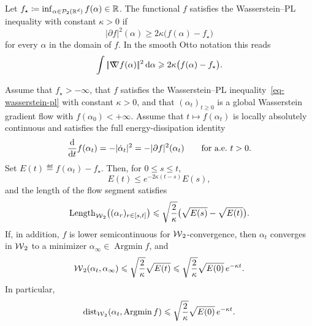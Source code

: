 \begin{defn}\label{def-wasserstein-pl}
	Let \(f_\star\coloneqq\inf_{\alpha\in\mathcal{P}_2(\mathbb{R}^d)} f(\alpha)\in\mathbb{R}\). The functional \(f\) satisfies the Wasserstein--PL inequality with constant \(\kappa>0\) if
	\begin{equation}\label{eq-wasserstein-pl}
		|\partial f|^2(\alpha)
		\geq
		2\kappa\bigl(f(\alpha)-f_\star\bigr)
	\end{equation}
	for every \(\alpha\) in the domain of \(f\). In the smooth Otto notation this reads
	\[
		\int|\!| \mathord{\nabla\mkern-9.3mu\nabla} f(\alpha) |\!|^2\,\mathrm{d}\alpha
		\geqslant
		2\kappa\bigl(f(\alpha)-f_\star\bigr).
	\]
\end{defn}

\begin{thm}\label{thm-wasserstein-pl-convergence}
	Assume that \(f_\star>-\infty\), that \(f\) satisfies the Wasserstein--PL inequality~\eqref{eq-wasserstein-pl} with constant \(\kappa>0\), and that \((\alpha_t)_{t\geq0}\) is a global Wasserstein gradient flow with $f(\alpha_0)<+\infty$. Assume that $t\mapsto f(\alpha_t)$ is locally absolutely continuous and satisfies the full energy-dissipation identity
	\begin{equation}\label{eq-full-wasserstein-energy-dissipation}
		\frac{\mathrm{d}}{\mathrm{d} t}f(\alpha_t)
		=
		-|\dot\alpha_t|^2
		=
		-|\partial f|^2(\alpha_t)
		\qquad\text{for a.e.\ }t>0.
	\end{equation}
	Set \(E(t)\eqdef f(\alpha_t)-f_\star\). Then, for \(0\leq s\leq t\),
	\[
		E(t)\leq e^{-2\kappa(t-s)}E(s),
	\]
	and the length of the flow segment satisfies
	\[
		\operatorname{Length}_{\operatorname{\mathcal{W}}_2}\bigl((\alpha_r)_{r\in[s,t]}\bigr)
		\leqslant
		\sqrt{\frac{2}{\kappa}}\bigl(\sqrt{E(s)}-\sqrt{E(t)}\bigr).
	\]
	If, in addition, \(f\) is lower semicontinuous for \(\operatorname{\mathcal{W}}_2\)-convergence, then \(\alpha_t\) converges in \(\operatorname{\mathcal{W}}_2\) to a minimizer \(\alpha_\infty\in\operatorname{Argmin} f\), and
	\[
		\operatorname{\mathcal{W}}_2(\alpha_t,\alpha_\infty)
		\leqslant
		\sqrt{\frac{2}{\kappa}}\sqrt{E(t)}
		\leqslant
		\sqrt{\frac{2}{\kappa}}\sqrt{E(0)}\,e^{-\kappa t}.
	\]
	In particular,
	\[
		\operatorname{dist}_{\operatorname{\mathcal{W}}_2}(\alpha_t,\operatorname{Argmin}f)
		\leqslant
		\sqrt{\frac{2}{\kappa}}\sqrt{E(0)}\,e^{-\kappa t}.
	\]
\end{thm}

